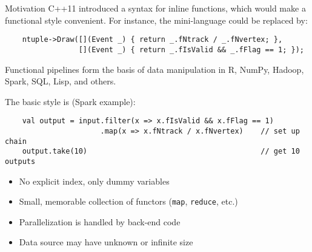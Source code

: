 \documentclass{beamer}
\begin{document}
\begin{frame}[fragile]{Motivation}
C++11 introduced a syntax for inline functions, which would make a functional style convenient. For instance, the mini-language could be replaced by:
{\scriptsize \begin{verbatim}
    ntuple->Draw([](Event _) { return _.fNtrack / _.fNvertex; },
                 [](Event _) { return _.fIsValid && _.fFlag == 1; });
\end{verbatim}}

\vfill
Functional pipelines form the basis of data manipulation in R, NumPy, Hadoop, Spark, SQL, Lisp, and others.

\vfill
The basic style is (Spark example):
{\scriptsize \begin{verbatim}
    val output = input.filter(x => x.fIsValid && x.fFlag == 1)
                      .map(x => x.fNtrack / x.fNvertex)    // set up chain
    output.take(10)                                        // get 10 outputs
\end{verbatim}}
\begin{itemize}
\item No explicit index, only dummy variables
\item Small, memorable collection of functors ({\tt map}, {\tt reduce}, etc.)
\item Parallelization is handled by back-end code
\item Data source may have unknown or infinite size
\end{itemize}
\end{frame}
\end{document}
